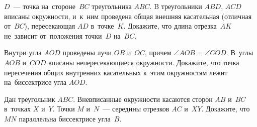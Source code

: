 \begin{problems}
\item
$D$~--- точка на~стороне~$BC$ треугольника $ABC$.
B треугольники $ABD$, $ACD$ вписаны окружности, и~к~ним проведена общая внешняя
касательная (отличная от~$BC$), пересекающая $AD$ в~точке~$K$.
Докажите, что длина отрезка~$AK$ не~зависит от~положения точки~$D$ на~$BC$.

\item
Внутри угла $AOD$ проведены лучи $OB$ и~$OC$, причем
$\angle AOB = \angle COD$.
В~углы $AOB$ и~$COD$ вписаны непересекающиеся окружности.
Докажите, что точка пересечения общих внутренних касательных к~этим окружностям
лежит на~биссектрисе угла $AOD$.

\item
Дан треугольник $ABC$.
Вневписанные окружности касаются сторон $AB$ и~$BC$ в~точках $X$ и~$Y$.
Точки $M$ и~$N$~--- середины отрезков $AC$ и~$XY$.
Докажите, что $MN$ параллельна биссектрисе угла~$B$.

\end{problems}


